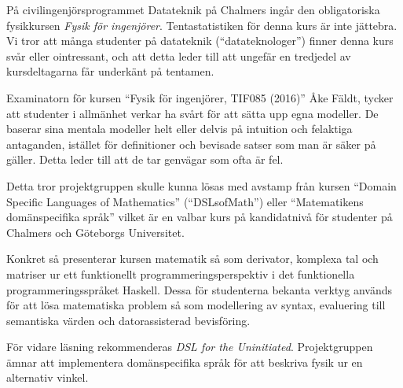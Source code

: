 \begin{draft}

På civilingenjörsprogrammet Datateknik på Chalmers ingår den obligatoriska fysikkursen
\textit{Fysik för ingenjörer}. Tentastatistiken för denna kurs är
inte jättebra\cite{tentastatistik}. Vi
tror att många studenter på datateknik (``datateknologer'') finner denna kurs
svår eller ointressant, och att detta leder till att ungefär en
tredjedel av kursdeltagarna får underkänt på tentamen.

Examinatorn för kursen ``Fysik för ingenjörer, TIF085 (2016)'' Åke Fäldt, tycker
att studenter i allmänhet verkar ha svårt för att sätta upp egna
modeller. De baserar sina mentala modeller helt eller delvis på
intuition och felaktiga antaganden, istället för definitioner och
bevisade satser som man är säker på gäller. Detta leder till att de
tar genvägar som ofta är fel.

Detta tror projektgruppen skulle kunna lösas med avstamp från kursen ``Domain Specific Languages of
Mathematics'' (``DSLsofMath'') eller ``Matematikens domänspecifika språk''
vilket är en valbar kurs på kandidatnivå för studenter på Chalmers och
Göteborgs Universitet.

\iffalse
Domänspecifika språk, kan
förklaras som ett språk konstruerat för ett specifikt område, d.v.s. en
domän. Språket kan användas för att enklare uttrycka uttryck inom
domänen, till exempel Newtons andra lag $F=m \cdot a$, än vad som är
möjligt inom generella (programmerings) språk. Exemplet ovan kan i ett 
domänspecifikt språk evalueras enklare m.h.a. ett syntaxträd och mönstermatchning,
gentemot ett generellt språk där exempelvis en rekursiv swith-case sats skulle kunna användas. 
Dock med mer overhead\todo{Visa bild på syntaxträd för m * a}. 
\fi

Konkret så presenterar kursen matematik så som derivator, komplexa
tal och matriser ur ett funktionellt programmeringsperspektiv i det funktionella programmeringsspråket
Haskell. Dessa för studenterna bekanta verktyg används för att lösa
matematiska problem så som modellering av syntax, evaluering till
semantiska värden och datorassisterad bevisföring.


För vidare läsning
rekommenderas \textit{DSL for the Uninitiated}.\cite{DSLU} Projektgruppen ämnar att implementera 
domänspecifika språk för att beskriva fysik ur en alternativ vinkel.


\end{draft}
